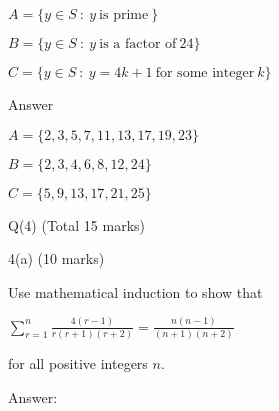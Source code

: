 \documentclass[a4paper,12pt,oneside]{book}
\theoremstyle{definition}
\begin{document}
$A = \{ y \in S \ : \ y \ \text{is prime} \ \}$

$B = \{ y \in S \ : \ y \ \text{is a factor of} \ 24 \}$

$C = \{ y \in S \ : \ y = 4k+1 \ \text{for some integer} \ k \}$

Answer

$A = \{ 2,3,5,7,11,13,17,19,23 \}$

$B = \{ 2,3,4,6,8,12,24 \}$

$C = \{ 5,9,13,17,21,25 \}$













































































\newpage 

Q(4) (Total 15 marks)

4(a) (10 marks)

Use mathematical induction to show that

$\sum_{r=1}^n \frac{4(r-1)}{r(r+1)(r+2)} = \frac{n(n-1)}{(n+1)(n+2)}$

for all positive integers $n$.

Answer:
\end{document}
